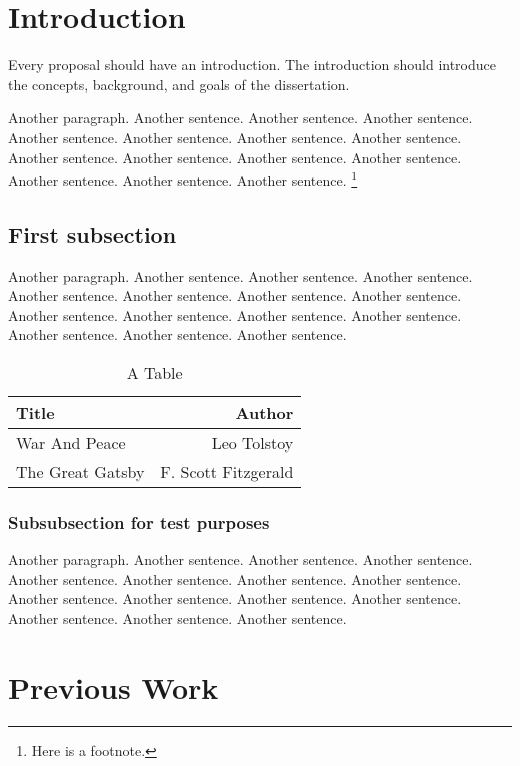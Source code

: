 \documentclass[12pt,econ]{article}
\begin{document}
\section{Introduction}

Every proposal should have an introduction.
The introduction should introduce the concepts, background, and goals of the dissertation.

Another paragraph.
Another sentence. Another sentence. Another sentence. Another sentence. Another sentence. Another sentence. Another sentence. Another sentence. Another sentence. Another sentence. Another sentence. Another sentence. Another sentence. Another sentence.%
\footnote{%
Here is a footnote.}
%





\subsection{First subsection}

Another paragraph.
Another sentence. Another sentence. Another sentence. Another sentence. Another sentence. Another sentence. Another sentence. Another sentence. Another sentence. Another sentence. Another sentence. Another sentence. Another sentence. Another sentence. 

\begin{table}[p]\centering
\caption[Short Caption]{A Table}
\begin{tabular}{lr}\hline\hline
Title & Author \\ \hline
War And Peace & Leo Tolstoy \\
The Great Gatsby & F. Scott Fitzgerald \\ \hline
\end{tabular}
\end{table}


\subsubsection{Subsubsection for test purposes}

Another paragraph.
Another sentence. Another sentence. Another sentence. Another sentence. Another sentence. Another sentence. Another sentence. Another sentence. Another sentence. Another sentence. Another sentence. Another sentence. Another sentence. Another sentence. 



\section{Previous Work}
\end{document}
